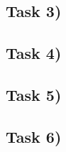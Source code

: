 \subsection{Task 3)}
\label{subsec:task3_a}


\subsection{Task 4)}
\label{subsec:task4_a}


\subsection{Task 5)}
\label{subsec:task5_a}


\subsection{Task 6)}
\label{subsec:task6_a}


